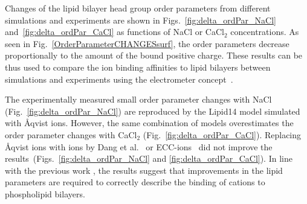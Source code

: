 \documentclass[aip,jcp,twocolumn]{revtex4}
\begin{document}
Changes of the lipid bilayer head group order parameters from different simulations and
experiments \cite{akutsu81, altenbach84} are shown in Figs.~\ref{fig:delta_ordPar_NaCl}
and~\ref{fig:delta_ordPar_CaCl} as functions of NaCl or CaCl$_2$ concentrations.
As seen in Fig.~\ref{OrderParameterCHANGESsurf}, the order parameters decrease
proportionally to the amount of the bound positive charge.
These results can be thus used to compare the ion binding affinities to lipid bilayers between
simulations and experiments using the electrometer concept~\cite{seelig87, catte16}.

The experimentally measured small order parameter
changes with NaCl (Fig.~\ref{fig:delta_ordPar_NaCl}) %
are reproduced by the Lipid14 model simulated with \AA{}qvist ions.
However, the same combination of models overestimates the order parameter changes with CaCl$_2$ (Fig.~\ref{fig:delta_ordPar_CaCl}).
%
%
%
Replacing \AA{}qvist ions with ions by Dang et al.~\cite{smith94, chang1999, dang2006}
or ECC-ions~\cite{martinek17, kohagen16, Pluharova2014} did not improve
the results~(Figs.~\ref{fig:delta_ordPar_NaCl} and \ref{fig:delta_ordPar_CaCl}).
In line with the previous work \cite{catte16}, the results suggest that improvements
in the lipid parameters are required to correctly describe the binding of cations to phospholipid bilayers.

\end{document}
